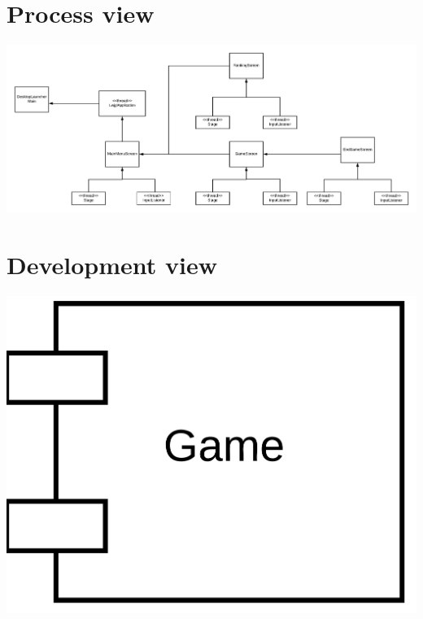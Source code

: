 \documentclass{article}
\begin{document}
\section{Process view}
\begin{center}
    \includegraphics[scale=0.6]{processview.png}
\end{center}

\section{Development view}
\begin{center}
    \includegraphics[scale=0.05]{developmentview.png}
\end{center}
\end{document}
